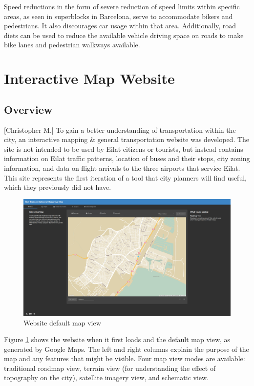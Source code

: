 \documentclass[12pt]{article}                               %
\begin{document}
Speed reductions in the form of severe reduction of speed limits within specific areas, as seen in superblocks in Barcelona, serve to accommodate bikers and pedestrians. It also discourages car usage within that area. Additionally, road diets can be used to reduce the available vehicle driving space on roads to make bike lanes and pedestrian walkways available.


\newpage
\section{Interactive Map Website}\label{sec:site}
\subsection{Overview}[Christopher M.]
To gain a better understanding of transportation within the city, an interactive mapping \& general transportation website was developed. The site is not intended to be used by Eilat citizens or tourists, but instead contains information on Eilat traffic patterns, location of buses and their stops, city zoning information, and data on flight arrivals to the three airports that service Eilat. This site represents the first iteration of a tool that city planners will find useful, which they previously did not have.

\begin{figure}[H]
    \centering
    \includegraphics[width=1\textwidth]{images/site_map.png}
    \caption{Website default map view}
    \label{img:site_map}
\end{figure}

Figure \ref{img:site_map} shows the website when it first loads and the default map view, as generated by Google Maps. The left and right columns explain the purpose of the map and any features that might be visible. Four map view modes are available: traditional roadmap view, terrain view (for understanding the effect of topography on the city), satellite imagery view, and schematic view.
\end{document}
